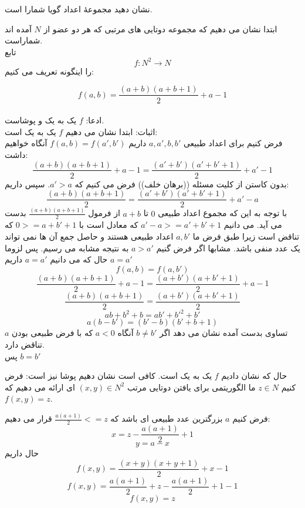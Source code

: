 نشان دهید مجموعهٔ اعداد گویا شمارا است.
\begin{ans}
    ابتدا نشان می دهیم که مجموعه دوتایی های مرتبی که هر دو عضو از 
    $N$
    آمده اند شماراست.
    \\
    تابع
    \[f:N^{2}\rightarrow N\]
    را اینگونه تعریف می کنیم:

    \[f(a,b) = \frac{(a+b)(a+b+1)}{2} + a - 1\]
    \\
    ادعا: 
    $f$
    یک به یک و پوشاست. 
    \\
    اثبات:
    ابتدا نشان می دهیم 
    $f$
    یک به یک است:
    \\
    فرض کنیم برای اعداد طبیعی
    $a,a',b,b'$
    داریم
    $f(a,b) = f(a',b')$
    آنگاه خواهیم داشت:
    \[\frac{(a+b)(a+b+1)}{2} + a - 1 = \frac{(a'+b')(a'+b'+1)}{2} + a' - 1\]
    بدون کاستن از کلیت  مسئله ((برهان خلف)) فرض می کنیم که 
    $a' > a$.
    سپس داریم:
    \[\frac{(a+b)(a+b+1)}{2} = \frac{(a'+b')(a'+b'+1)}{2} + a' - a\]
    با توجه به این که مجموع اعداد طبیعی 
    $0$
    تا
    $a+b$
    از فرمول 
    $\frac{(a+b)(a+b+1)}{2}$
    بدست می آید. می دانیم 
    $a'-a >= a'+b'+1$
    که معادل است با
    $0 >= a + b' + 1$
    که تناقض است زیرا طبق فرض ما 
    $a,b'$
    اعداد طبیعی هستند و حاصل جمع آن ها نمی تواند یک عدد منفی باشد. مشابها اگر فرض گنیم
    $a > a'$
    به نتیجه مشابه می رسیم. پس لزوما
    $a = a'$
    حال که می دانیم
    $a = a'$
    داریم
    \[f(a,b) = f(a,b')\]
    \[\frac{(a+b)(a+b+1)}{2} + a - 1 = \frac{(a+b')(a+b'+1)}{2} + a - 1\]
    \[\frac{(a+b)(a+b+1)}{2} = \frac{(a+b')(a+b'+1)}{2}\]
    \[ab + b^{2} + b = ab' + b'^{2} + b'\]
    \[a(b-b') = (b'-b)(b'+b+1)\]
    تساوی بدست آمده نشان می دهد اگر 
    $b \neq b'$
    آنگاه 
    $a < 0$
    که با فرض طبیعی بودن 
    $a$
    تناقض دارد.
    \\
    پس 
    $b = b'$

    حال که نشان دادیم 
    $f$
    یک به یک است. کافی است نشان دهیم پوشا نیز است:
    فرض کنیم 
    $z \in N$
    ما الگوریتمی برای یافتن دوتایی مرتب 
    $(x,y) \in N^{2}$
    ای ارائه می دهیم که 
    $f(x,y) = z$.

    فرض کنیم 
    $a$
    بزرگترین عدد طبیعی ای باشد که 
    $\frac{a(a+1)}{2} <= z$
    قرار می دهیم:
    \[x = z - \frac{a(a+1)}{2} + 1\]
    \[y = a - x\]
    حال داریم
    \[f(x,y) = \frac{(x+y)(x+y+1)}{2} + x - 1\]
    \[f(x,y) = \frac{a(a+1)}{2} + z - \frac{a(a+1)}{2} + 1 -1\]
    \[f(x,y) = z\]


\end{ans}

